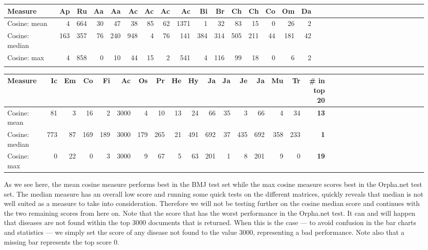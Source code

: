 \begin{table}[H]
  \label{testResult_termDoc_orphan_hist_3000_ns_mea_med_max_nc}
  \begin{tiny}
    \begin{tabular}{|l|r|r|r|r|r|r|r|r|r|r|r|r|r|r|r|r|r|r|r|r|r|r|r|r|r|r|r|r|r|r|r|}
      \hline
      Measure &Ap&Ru&Aa&Aa&Ac&Ac&Ac&Ac&Bi&Br&Ch&Ch&Co&Om&Da\\
      \hline
      Cosine: mean & 4 & 664 & 30 & 47 & 38 & 85 & 62 & 1371 & 1 & 32 & 83 & 15 & 0 & 26 & 2 \\
      \hline
      Cosine: median & 163 & 357 & 76 & 240 & 948 & 4 & 76 & 141 & 384 & 314 & 505 & 211 & 44 & 181 & 42 \\
      \hline
      Cosine: max & 4 & 858 & 0 & 10 & 44 & 15 & 2 & 541 & 4 & 116 & 99 & 18 & 0 & 6 & 2\\
      \hline
      \multicolumn{16}{c}{} \\
    \end{tabular}
    \begin{tabular}{|l|r|r|r|r|r|r|r|r|r|r|r|r|r|r|r|r|r|r|r|r|r|r|r|r|r|r|r|r|r|r|}
      \hline
      Measure &Ic&Em&Co&Fi&Ac&Os&Pr&He&Hy&Ja&Ja&Je&Ja&Mu&Tr &  \scriptsize{\textbf{\# in top 20}} \\
      \hline
      Cosine: mean & 81 & 3 & 16 & 2 & 3000 & 4 & 10 & 13 & 24 & 66 & 35 & 3 & 66 & 4 & 34 & \scriptsize{\textbf{13}} \\
      \hline
      Cosine: median & 773 & 87 & 169 & 189 & 3000 & 179 & 265 & 21 & 491 & 692 & 37 & 435 & 692 & 358 & 233 & \scriptsize{\textbf{1}} \\
      \hline
      Cosine: max  & 0 & 22 & 0 & 3 & 3000 & 9 & 67 & 5 & 63 & 201 & 1 & 8 & 201 & 9 & 0 & \scriptsize{\textbf{19}} \\
      \hline
    \end{tabular}
  \end{tiny}
\end{table}

As we see here, the mean cosine measure performs best in the BMJ test
set while the max cosine measure scores best in the Orpha.net test
set. The median measure has an overall low score and running some
quick tests on the different matrices, quickly reveals that median is
not well suited as a measure to take into consideration. Therefore we
will not be testing further on the cosine median score and continues
with the two remaining scores from here on. Note that the score that
has the worst performance in the Orpha.net test. It can and will
happen that diseases are not found within the top 3000 documents that
is returned. When this is the case --- to avoid confusion in the bar
charts and statistics --- we simply set the score of any disease not
found to the value 3000, representing a bad performance. Note also
that a missing bar represents the top score 0.

